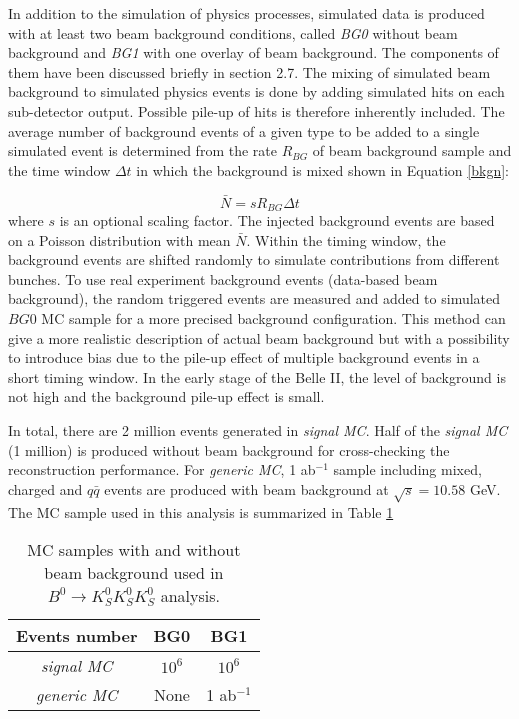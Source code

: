 In addition to the simulation of physics processes,  simulated data is produced with at least two beam background conditions, called \textit{BG0} without beam background and \textit{BG1} with one overlay of beam background. The components of them have been discussed briefly in section 2.7. The mixing of simulated beam background to simulated physics events is done by adding simulated hits on each sub-detector output. Possible pile-up of hits is therefore inherently included. The average number of background events of a given type to be added to a single simulated event is determined from the rate $R_{BG}$ of beam background sample and the time window $\Delta t$ in which the background is mixed shown in Equation \ref{bkgn}:

\begin{equation}\label{bkgn}
	\bar{N} = sR_{BG}\Delta t
\end{equation}
where $s$ is an optional scaling factor. The injected background events are based on a Poisson distribution with mean $\bar{N}$. Within the timing window, the background events are shifted randomly to simulate contributions from different bunches. To use real experiment background events (data-based beam background), the random triggered events are measured and added to
simulated $BG0$ MC sample for a more precised background configuration. This method can give a more realistic description of actual beam background but with a possibility to introduce bias due to the pile-up effect of multiple background events in a short timing window. In the early stage of the Belle II, the level of background is not high and the background pile-up effect is small.

In total, there are 2 million events generated in \textit{signal MC}. Half of the \textit{signal MC} (1 million) is produced without beam background for cross-checking the reconstruction performance. For \textit{generic MC}, 1 ab$^{-1}$ sample including mixed, charged and $q\bar{q}$ events are produced with beam background at  $\sqrt{s} = 10.58 $ GeV. The MC sample used in this analysis is summarized in Table \ref{tab:mc_all}

\begin{table}
	\large
	\caption{MC samples with and without beam background used in $B^0 \to K_S^0  K_S^0  K_S^0$ analysis.}
	\label{tab:mc_all}
	\centering
	\begin{tabular}{c|c|c}
		\hline 
		Events number & BG0 & BG1 \\
		\hline
		\textit{\textit{signal MC}} & $10^6$ & $10^6$ \\
		\hline
		\textit{\textit{generic MC}} & None & 1 ab$^{-1}$\\
		\hline
	\end{tabular}
\end{table}


